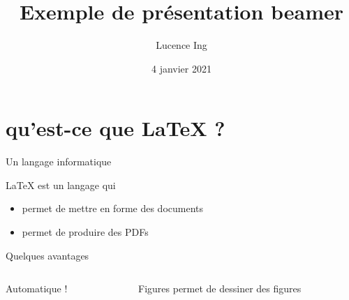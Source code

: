 \documentclass[ignorenonframetext]{beamer}
\title{Exemple de présentation beamer}
\date{4 janvier 2021}
\author{Lucence Ing}
\begin{document}
	
	\begin{frame}{}
		\maketitle
	\end{frame}
	
	\section{qu'est-ce que \LaTeX{} ?}
	
	\begin{frame}{Un langage informatique}
		
		\begin{block}{\LaTeX{} est un langage qui}
			\begin{itemize}
				\item permet de mettre en forme des documents
				\item permet de produire des PDFs
			\end{itemize}
			
		\end{block}
		
	\end{frame}
	
	\begin{frame}{Quelques avantages}
		
		\begin{columns}
			\begin{column}{0.4\textwidth}
				Automatique !
			\end{column}
			\begin{column}{0.6\textwidth}
				\begin{alertblock}{Figures}
					permet de dessiner des figures
				\end{alertblock}
				
			\end{column}
			
		\end{columns}
		
	\end{frame}
	
	
\end{document}
